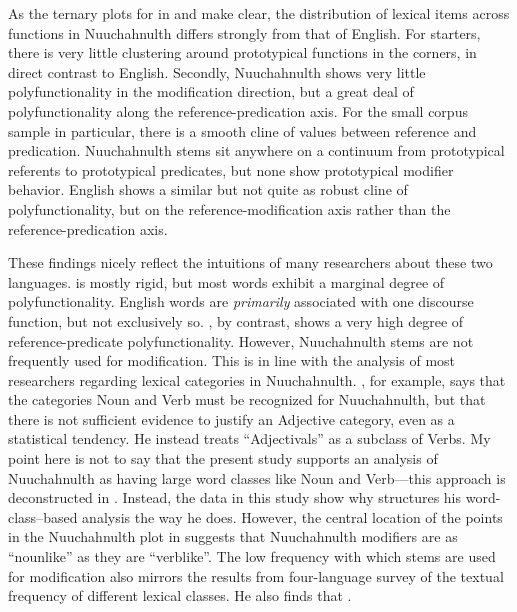 As the ternary plots for  in  and  make clear, the distribution of lexical items across functions in Nuuchahnulth differs strongly from that of English. For starters, there is very little clustering around prototypical functions in the corners, in direct contrast to English. Secondly, Nuuchahnulth shows very little polyfunctionality in the modification direction, but a great deal of polyfunctionality along the reference-predication axis. For the small corpus sample in particular, there is a smooth cline of values between reference and predication. Nuuchahnulth stems sit anywhere on a continuum from prototypical referents to prototypical predicates, but none show prototypical modifier behavior. English shows a similar but not quite as robust cline of polyfunctionality, but on the reference-modification axis rather than the reference-predication axis.

These findings nicely reflect the intuitions of many researchers about these two languages.  is mostly rigid, but most words exhibit a marginal degree of polyfunctionality. English words are \emph{primarily} associated with one discourse function, but not exclusively so. , by contrast, shows a very high degree of reference-predicate polyfunctionality. However, Nuuchahnulth stems are not frequently used for modification. This is in line with the analysis of most researchers regarding lexical categories in Nuuchahnulth. \textcite[50]{Nakayama2001}, for example, says that the categories Noun and Verb must be recognized for Nuuchahnulth, but that there is not sufficient evidence to justify an Adjective category, even as a statistical tendency. He instead treats \enquote{Adjectivals} as a subclass of Verbs. My point here is not to say that the present study supports an analysis of Nuuchahnulth as having large word classes like Noun and Verb—this approach is deconstructed in . Instead, the data in this study show why \citeauthor{Nakayama2001} structures his word-class–based analysis the way he does. However, the central location of the points in the Nuuchahnulth plot in  suggests that Nuuchahnulth modifiers are as \enquote{nounlike} as they are \enquote{verblike}. The low frequency with which stems are used for modification also mirrors the results from  four-language survey of the textual frequency of different lexical classes. He also finds that .

